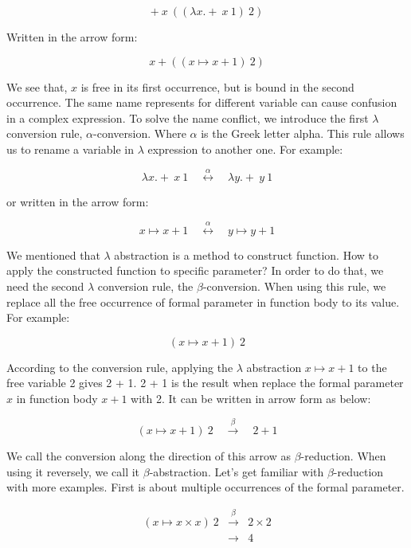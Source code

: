 \documentclass{article}
\begin{document}
\[
+\ x\ ((\lambda x . +\ x\ 1)\ 2)
\]

Written in the arrow form:

\[
x + ((x \mapsto x + 1)\ 2)
\]

We see that, $x$ is free in its first occurrence, but is bound in the second occurrence. The same name represents for different variable can cause confusion in a complex expression. To solve the name conflict, we introduce the first $\lambda$ conversion rule, $\alpha$-conversion. Where $\alpha$ is the Greek letter alpha. This rule allows us to rename a variable in $\lambda$ expression to another one. For example:

\[
\lambda x . +\ x\ 1 \quad \overset{\alpha}{\longleftrightarrow} \quad \lambda y . +\ y\ 1
\]


or written in the arrow form:

\[
x \mapsto x + 1 \quad \overset{\alpha}{\longleftrightarrow} \quad y \mapsto y + 1
\]

We mentioned that $\lambda$ abstraction is a method to construct function. How to apply the constructed function to specific parameter? In order to do that, we need the second $\lambda$ conversion rule, the $\beta$-conversion. When using this rule, we replace all the free occurrence of formal parameter in function body to its value. For example:

\[
(x \mapsto x + 1)\ 2
\]

According to the conversion rule, applying the $\lambda$ abstraction $x \mapsto x + 1$ to the free variable 2 gives 2 + 1. 2 + 1 is the result when replace the formal parameter $x$ in function body $x + 1$ with 2. It can be written in arrow form as below:

\[
(x \mapsto x + 1)\ 2 \quad \overset{\beta}{\longrightarrow} \quad 2 + 1
\]

We call the conversion along the direction of this arrow as $\beta$-reduction. When using it reversely, we call it $\beta$-abstraction. Let's get familiar with $\beta$-reduction with more examples. First is about multiple occurrences of the formal parameter.

\[
\begin{array}{rcl}
(x \mapsto x \times x)\ 2 & \overset{\beta}{\longrightarrow} & 2 \times 2 \\
                          & \longrightarrow & 4 \\
\end{array}
\]
\end{document}
